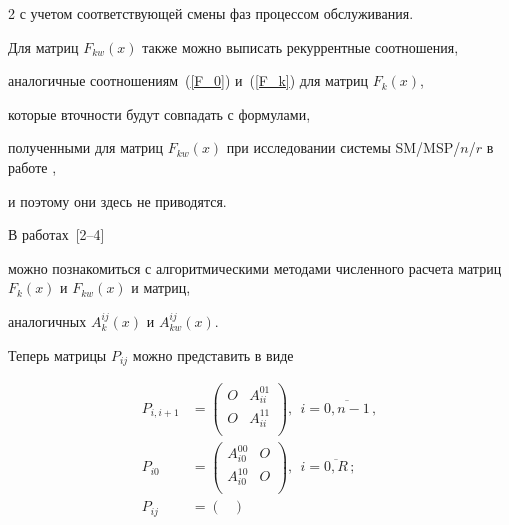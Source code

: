 \begin{multicols}{2}
с учетом соответствующей смены фаз процессом обслуживания.





Для матриц $F_{kw}(x)$ также можно выписать рекуррентные соотношения,


аналогичные со\-от\-но\-шениям~(\ref{F_0}) и~(\ref{F_k}) для матриц $F_k(x)$,


которые в\linebreak точности будут совпадать с формулами,


полученными для  матриц $F_{kw}(x)$ при исследовании системы SM/MSP/$n$/$r$ в работе \cite{PCh04},


и поэтому они здесь не приводятся.


В работах~[2--4]


можно познакомиться с алгоритмическими методами численного расчета матриц $F_k(x)$ и $F_{kw}(x)$ и матриц,


аналогичных $A^{ij}_k(x)$ и $A^{ij}_{kw}(x)$.





Теперь матрицы $P_{ij}$ можно представить в виде


\begin{align}


\label{p_ij}


P_{i,i+1}&=


\begin{pmatrix}


O & A^{01}_{ii}\\[6pt]


O & A^{11}_{ii}\\


\end{pmatrix},\ \ i=\overline{0,n-1}\,,


\\


P_{i0}&=


\begin{pmatrix}


A^{00}_{i0} & O \\[6pt]


A^{10}_{i0} & O \\


\end{pmatrix}, \ \ i=\overline{0,R}\,;\\


P_{ij}&=


\begin{pmatrix}



\end{pmatrix}
\end{align}
\end{multicols}
